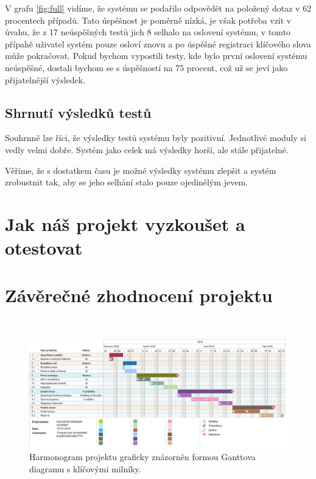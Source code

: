 \documentclass[12pt,a4paper]{article}
\begin{document}
V grafu \ref*{fig:full} vidíme, že systému se podařilo odpovědět na položený dotaz v 62 procentech případů. Tato úspěšnost je poměrně nízká, je však potřeba vzít v úvahu, že z 17 neúspěšných testů jich 8 selhalo na oslovení systému, v tomto přípahě uživatel systém pouze osloví znovu a po úspěšné registraci klíčového slova může pokračovat. Pokud bychom vypostili testy, kde bylo první oslovení systému neúspěšné, dostali bychom se s úspěšností na 75 procent, což už se jeví jako přijatelnější výsledek.

\subsection{Shrnutí výsledků testů}
Souhrnně lze říci, že výsledky testů systému byly pozitivní. Jednotlivé moduly si vedly velmi dobře. Systém jako celek má výsledky horší, ale stále přijatelné.

Věříme, že s dostatkem času je možné výsledky systému zlepšit a systém zrobustnit tak, aby se jeho selhání stalo pouze ojedinělým jevem.



\section{Jak náš projekt vyzkoušet a otestovat}

\section{Závěrečné zhodnocení projektu}


\begin{landscape}
~\vfill
\begin{figure}[ht]
	\begin{center}
	\includegraphics[height = 0.6\textheight ]{PTO-Gantt.png}
	\caption{Harmonogram projektu graficky znázorněn formou Ganttova diagramu s klíčovými milníky.}
	\label{fig:diagram_gantt}
	\end{center}
\end{figure}
\vfill
\end{landscape}
\end{document}
